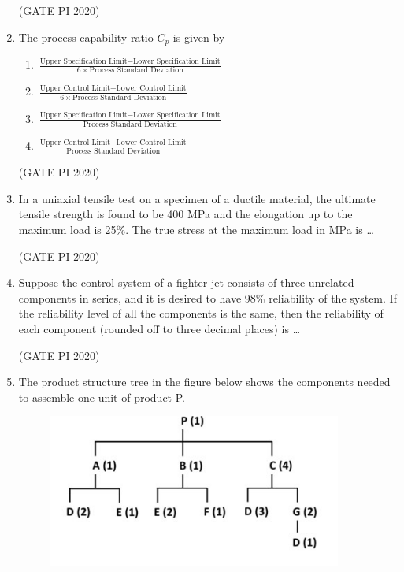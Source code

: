 \documentclass[journal,12pt,onecolumn]{IEEEtran}
\theoremstyle{remark}
\begin{document}
\begin{enumerate}
\hfill (GATE PI 2020)

\item The process capability ratio $C_p$ is given by 

\begin{enumerate}
\setlength{\itemsep}{1em}
\item $\frac{\text{Upper Specification Limit} - \text{Lower Specification Limit}}{6 \times \text{Process Standard Deviation}}$
\item $\frac{\text{Upper Control Limit} - \text{Lower Control Limit}}{6 \times \text{Process Standard Deviation}}$
\item $\frac{\text{Upper Specification Limit} - \text{Lower Specification Limit}}{\text{Process Standard Deviation}}$
\item $\frac{\text{Upper Control Limit} - \text{Lower Control Limit}}{\text{Process Standard Deviation}}$
\end{enumerate}

\hfill (GATE PI 2020)

\item In a uniaxial tensile test on a specimen of a ductile material, the ultimate tensile strength is found to be 400 MPa and the elongation up to the maximum load is 25\%. The true stress at the maximum load in MPa is \dots

\hfill (GATE PI 2020)

\item Suppose the control system of a fighter jet consists of three unrelated components in series, and it is desired to have 98\% reliability of the system. If the reliability level of all the components is the same, then the reliability of each component (rounded off to three decimal places) is \dots

\hfill (GATE PI 2020)

\item The product structure tree in the figure below shows the components needed to assemble one unit of product P.

\begin{figure}[h]
    \centering
    \includegraphics[width=0.5\columnwidth]{figs/fig10.png}
    \caption{}
    \label{fig:placeholder}
\end{figure}


\end{enumerate}
\end{document}
